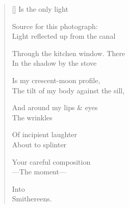 \label{ch:venezia}
\settowidth{\versewidth}{The tilt of my body against the sill,}
\begin{verse}[\versewidth]
               Is the only light

Source for this photograph:\\
Light reflected up from the canal

Through the kitchen window.     There\\
In the shadow by the stove

Is my crescent-moon profile,\\
The tilt of my body against the sill,

And around my lips \& eyes\\
The wrinkles

Of incipient laughter\\
About to splinter

Your careful composition\\
---The moment---

                               Into\\
Smithereens.
\end{verse}
